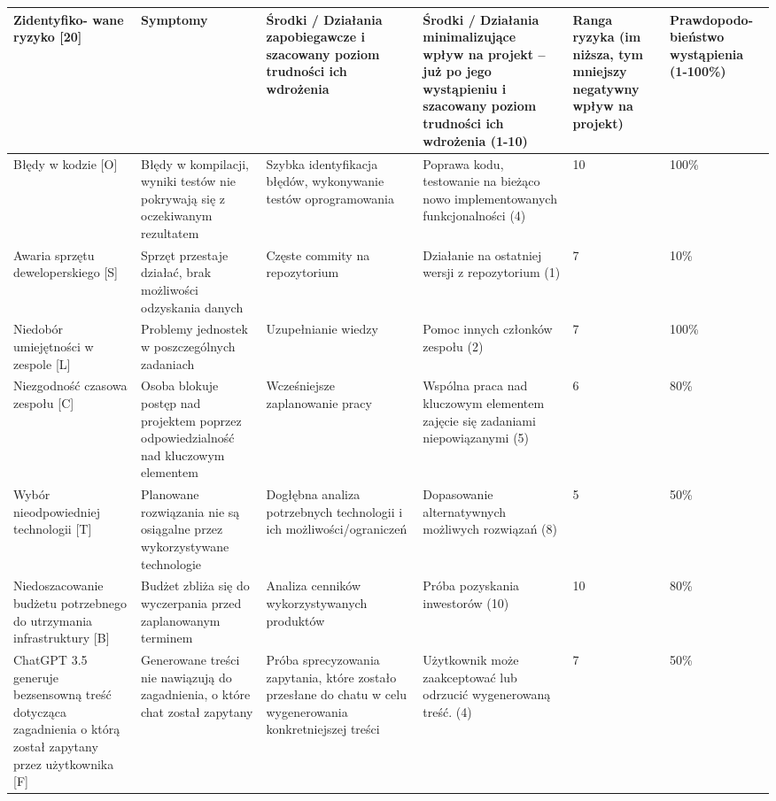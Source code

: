 \begin{tabular}{|p{2.3cm}|p{2.3cm}|p{2.3cm}|p{2.3cm}|p{2.3cm}|p{2.3cm}|}
    \hline
\textbf{Zidentyfiko- wane ryzyko [20]} & \textbf{Symptomy} & \textbf{Środki / Działania zapobiegawcze i szacowany poziom trudności ich wdrożenia} & \textbf{Środki / Działania minimalizujące wpływ na projekt – już po jego wystąpieniu i szacowany poziom trudności ich wdrożenia (1-10)} & \textbf{Ranga ryzyka (im niższa, tym mniejszy negatywny wpływ na projekt)} & \textbf{Prawdopodo- bieństwo wystąpienia (1-100\%)} \\
\hline
Błędy w kodzie [O] & Błędy w kompilacji, wyniki testów nie pokrywają się z oczekiwanym rezultatem  & Szybka identyfikacja błędów, wykonywanie testów oprogramowania & Poprawa kodu, testowanie na bieżąco nowo implementowanych funkcjonalności (4) & 10 & 100\% \\
\hline
Awaria sprzętu deweloperskiego [S] & Sprzęt przestaje działać, brak możliwości odzyskania danych & Częste commity na repozytorium & Działanie na ostatniej wersji z repozytorium (1) & 7 & 10\% \\
\hline
Niedobór umiejętności w zespole [L] & Problemy jednostek w poszczególnych zadaniach & Uzupełnianie wiedzy & Pomoc innych członków zespołu (2) & 7 & 100\% \\
\hline
Niezgodność czasowa zespołu [C]  & Osoba blokuje postęp nad projektem poprzez odpowiedzialność nad kluczowym elementem & Wcześniejsze zaplanowanie pracy & Wspólna praca nad kluczowym elementem zajęcie się zadaniami niepowiązanymi (5) & 6 & 80\% \\
\hline
Wybór nieodpowiedniej technologii [T] & Planowane rozwiązania nie są osiągalne przez wykorzystywane technologie & Dogłębna analiza potrzebnych technologii i ich możliwości/ograniczeń & Dopasowanie alternatywnych możliwych rozwiązań (8) & 5 & 50\% \\
\hline
Niedoszacowanie budżetu potrzebnego do utrzymania infrastruktury [B] & Budżet zbliża się do wyczerpania przed zaplanowanym terminem  & Analiza cenników wykorzystywanych produktów & Próba pozyskania inwestorów (10) & 10 & 80\% \\
\hline
ChatGPT 3.5 generuje bezsensowną treść dotycząca zagadnienia o którą został zapytany przez użytkownika [F] & Generowane treści nie nawiązują do zagadnienia, o które chat został zapytany & Próba sprecyzowania zapytania, które zostało przesłane do chatu w celu wygenerowania konkretniejszej treści & Użytkownik może zaakceptować lub odrzucić wygenerowaną treść.  (4) & 7 & 50\% \\
\hline
\end{tabular}
\clearpage